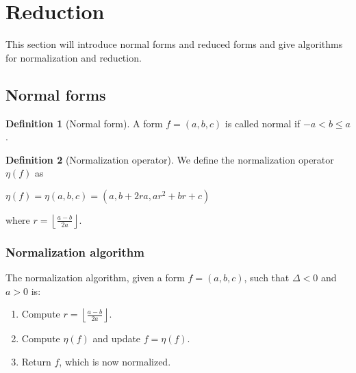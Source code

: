 \documentclass{article}
\theoremstyle{definition}
\newtheorem{definition}{Definition}[section]
\theoremstyle{theorem}
\theoremstyle{example}
\theoremstyle{corollary}
\begin{document}
\bigskip








\section{Reduction}

\bigskip

This section will introduce normal forms and reduced forms and give algorithms for normalization and reduction.

\bigskip

\subsection{Normal forms}

\bigskip

\theoremstyle{definition}
\begin{definition}[Normal form]
A form \(f = (a, b, c)\) is called normal if \(-a < b \le a\).
\end{definition}

\bigskip

\theoremstyle{definition}
\begin{definition}[Normalization operator]
We define the normalization operator \(\eta (f)\) as
\begin{center}
\(\eta (f)  = \eta (a, b, c) = (a, b + 2ra, ar^{2} + br + c)\)
\end{center}
where \(r = \left\lfloor \frac{a-b}{2a} \right\rfloor\).
\end{definition}

\bigskip

\subsubsection{Normalization algorithm}

\bigskip

The normalization algorithm, given a form \(f = (a, b, c)\), such that \(\Delta < 0\) and \(a > 0\) is:
\begin{enumerate}
\item Compute \(r = \left\lfloor \frac{a-b}{2a} \right\rfloor\).
\item Compute \(\eta( f)\) and update \(f = \eta(f)\).
\item Return \(f\), which is now normalized.
\end{enumerate}
\end{document}
